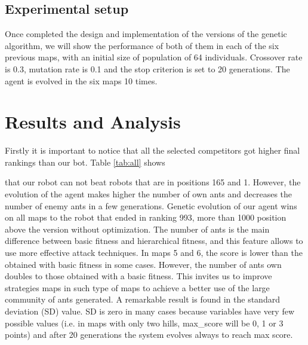 \documentclass[runningheads]{llncs}
\begin{document}
\subsection{Experimental setup}

Once completed the design and implementation of the versions of the genetic algorithm, we will show the performance of both of them in each of the six previous maps, with an initial size of population of 64 individuals. Crossover rate is 0.3, mutation rate is 0.1 and the stop criterion is set to 20 generations. The agent is evolved in the six maps 10 times.

\section{Results and Analysis}
\label{sec:results}


Firstly it is important to notice that all the selected competitors got higher final rankings than our bot. Table \ref{tab:all} shows 


that our robot can not beat robots that are in positions 165 and 1. However, the evolution of the agent makes higher the number of own ants and decreases the number of enemy ants in a few generations. Genetic evolution of our agent wins on all maps to the robot that ended in ranking 993, more than 1000 position above the version without optimization. The number of ants is the main difference between basic fitness and hierarchical fitness, and this feature allows to use more effective attack techniques. In maps 5 and 6, the score is lower than the obtained with basic fitness in some cases. However, the number of ants own doubles to those obtained with a basic fitness. This invites us to improve strategies maps in such type of maps to achieve a better use of the large community of ants generated. A remarkable result is found in the standard deviation (SD) value. SD is zero in many cases because variables have very few possible values (i.e. in maps with only two hills, max\_score will be 0, 1 or 3 points) and after 20 generations the system evolves always to reach max score. 
%
%
%
%
\end{document}
